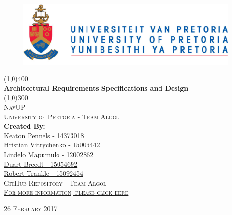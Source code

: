 \documentclass{article}
\begin{document}
	\begin{titlepage}
		\begin{center}

			\begin{figure}
				\includegraphics[width=\linewidth]{logo.jpg}	
			\end{figure}

			\line(1,0){400}\\
			[6mm]
			\huge{
				\bfseries Architectural Requirements Specifications and Design
			}\\
			[2mm]
			\line(1,0){300}\\
			[10mm]
			\textsc{\large NavUP}\\
			[7.5mm]
			\textsc{\large University of Pretoria - Team Algol}\\
			[10mm]
			\large{\textbf{Created By:}}\\
			[2mm]
			\href{https://github.com/KeatonPennels}{Keaton Pennels - 14373018}\\
			\href{https://github.com/Chris19951225}{Hristian Vitrychenko - 15006442}\\
      \href{https://github.com/lindelo}{Lindelo Mapumulo - 12002862}\\
			\href{https://github.com/DuartBreedt}{Duart Breedt - 15054692}\\
			\href{https://github.com/roberttrankle}{Robert Trankle - 15092454}\\[5mm]


		\href{https://github.com/Chris19951225/COS-301-Team-Algol}{\textsc{\Large GitHub Repository - Team Algol}}
		\\
		\href{https://github.com/Chris19951225/COS-301-Team-Algol}{\textsc {For more information, please click here}}
		  
		\end{center}
		\begin{flushright}
			\textsc{\large 26 February 2017}
		\end{flushright}
	\end{titlepage}

	\cleardoublepage
	\thispagestyle{empty}
	\tableofcontents
	\cleardoublepage
\end{document}
